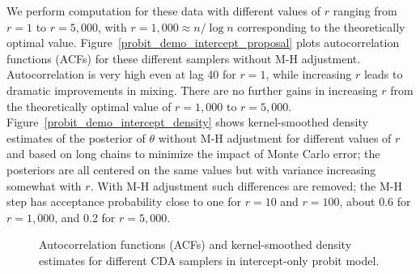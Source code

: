 \documentclass[12pt]{article}
\begin{document}
We perform computation for these data with different values of $r$ ranging from $r=1$ to $r=5,000$, with $r=1,000 \approx n/\log n$ corresponding to the theoretically optimal value.  Figure~\ref{probit_demo_intercept_proposal} plots autocorrelation functions (ACFs) for these different samplers without  M-H adjustment. Autocorrelation is very high even at lag 40 for $r=1$, while increasing $r$ leads to dramatic improvements in mixing. There are no further gains in increasing $r$ from the theoretically optimal value of $r=1,000$ to $r=5,000$. Figure~\ref{probit_demo_intercept_density} shows kernel-smoothed density estimates of the posterior of $\theta$ without M-H adjustment for different values of $r$ and based on long chains to minimize the impact of Monte Carlo error; the posteriors are all centered on the same values but with variance increasing somewhat with $r$.  With M-H adjustment such differences are removed; the M-H step has acceptance probability close to one for $r=10$ and $r=100$, about 0.6 for $r=1,000$, and 0.2 for $r=5,000$. 


\begin{figure}[H]
  {\caption{Autocorrelation functions (ACFs) and kernel-smoothed density estimates for different CDA samplers in intercept-only probit model.}}
  {%
    \quad
    \quad
  }
   \label{probit_demo_intercept}
\end{figure}
\end{document}
